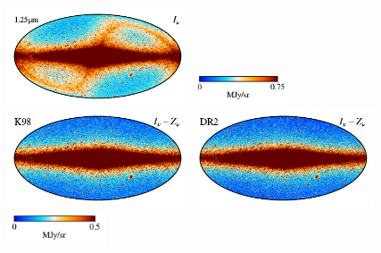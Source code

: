 \documentclass[twocolumn]{aa}
\begin{document}
\begin{figure}
    \centering

    \includegraphics[height=2.90cm]{figs/compare_freq_maps/cosmoglobe_ma_01.pdf}%
    \includegraphics[width=2.90cm,angle=90]{figs/compare_freq_maps/cbar_tot_01.pdf}%
    \includegraphics[height=2.90cm]{figs/compare_freq_maps/dirbe_zsma_01.pdf}%
    \includegraphics[height=2.90cm]{figs/compare_freq_maps/cosmoglobe_zsma_01.pdf}%
    \includegraphics[width=2.90cm,angle=90]{figs/compare_freq_maps/cbar_01.pdf}%
    \\



\end{figure}
\end{document}
